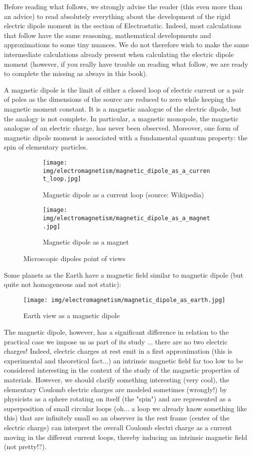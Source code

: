 	Before reading what follows, we strongly advise the reader (this even more than an advice) to read absolutely everything about the development of the rigid electric dipole moment in the section of Electrostatic. Indeed, most calculations that follow have the same reasoning, mathematical developments and approximations to some tiny nuances. We do not therefore wish to make the same intermediate calculations already present when calculating the electric dipole moment (however, if you really have trouble on reading what follow, we are ready to complete the missing as always in this book).
	
	A magnetic dipole is the limit of either a closed loop of electric current or a pair of poles as the dimensions of the source are reduced to zero while keeping the magnetic moment constant. It is a magnetic analogue of the electric dipole, but the analogy is not complete. In particular, a magnetic monopole, the magnetic analogue of an electric charge, has never been observed. Moreover, one form of magnetic dipole moment is associated with a fundamental quantum property: the spin of elementary particles.
	\begin{figure}[H]
	\centering
	\begin{subfigure}{.5\textwidth}
	  \centering
	  \texttt{[image: img/electromagnetism/magnetic\_dipole\_as\_a\_current\_loop.jpg]}
	  \caption[Magnetic dipole as a current loop]{Magnetic dipole as a current loop (source: Wikipedia)}
	\end{subfigure}
	\begin{subfigure}{.5\textwidth}
	  \centering
	  \texttt{[image: img/electromagnetism/magnetic\_dipole\_as\_a\_magnet.jpg]}
	  \caption{Magnetic dipole as a magnet}
	\end{subfigure}
	\caption{Microscopic dipoles point of views}
	\end{figure}
	Some planets as the Earth have a magnetic field similar to magnetic dipole (but quite not homogeneous and not static):
	\begin{figure}[H]
		\centering
		\texttt{[image: img/electromagnetism/magnetic\_dipole\_as\_earth.jpg]}
		\caption{Earth view as a magnetic dipole}
	\end{figure}
	
	The magnetic dipole, however, has a significant difference in relation to the practical case we impose us as part of its study ... there are no two electric charges! Indeed, electric charges at rest emit in a first approximation (this is experimental and theoretical fact...) an intrinsic magnetic field far too low to be considered interesting in the context of the study of the magnetic properties of materials. However, we should clarify something interesting (very cool), the elementary Coulomb electric charges are modeled sometimes (wrongly!) by physicists as a sphere rotating on itself (the "spin") and are represented as a superposition of small circular loops (oh... a loop we already know something like this) that are infinitely small so an observer in the rest frame (center of the electric charge) can interpret the overall Coulomb electri charge as a current moving in the different current loops, thereby inducing an intrinsic magnetic field (not pretty!?).
	
